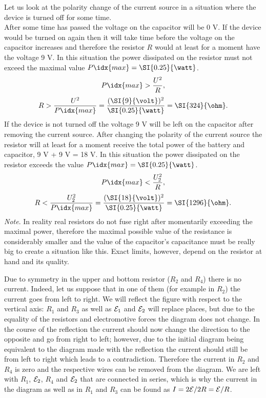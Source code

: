 \documentclass[11pt]{article}
\begin{document}
\solueng
Let us look at the polarity change of the current source in a situation where the device is turned off for some time.\\
After some time has passed the voltage on the capacitor will be 0 V. If the device would be turned on again then it will take time before the voltage on the capacitor increases and therefore the resistor $R$ would at least for a moment have the voltage 9 V. In this situation the power dissipated on the resistor must not exceed the maximal value $P\idx{max} = \SI{0.25}{\watt}$. 
\[P\idx{max} > \frac{U^2}{R},\] 
\[R > \frac{U^2}{P\idx{max}} = \frac{(\SI{9}{\volt})^2}{\SI{0.25}{\watt}} = \SI{324}{\ohm}. \]
If the device is not turned off the voltage 9 V will be left on the capacitor after removing the current source. After changing the polarity of the current source the resistor will at least for a moment receive the total power of the battery and capacitor, 9 V + 9 V = 18 V. In this situation the power dissipated on the resistor exceeds the value $P\idx{max} = \SI{0.25}{\watt}$. 
\[P\idx{max} < \frac{U_2^2}{R},\] 
\[R < \frac{U_2^2}{P\idx{max}} = \frac{(\SI{18}{\volt})^2}{\SI{0.25}{\watt}} = \SI{1296}{\ohm}. \]
\emph{Note}. In reality real resistors do not fuse right after momentarily exceeding the maximal power, therefore the maximal possible value of the resistance is considerably smaller and the value of the capacitor’s capacitance must be really big to create a situation like this. Exact limits, however, depend on the resistor at hand and its quality.
\probend
\bigskip


\solueng
Due to symmetry in the upper and bottom resistor ($R_2$ and $R_4$) there is no current. Indeed, let us suppose that in one of them (for example in $R_2$) the current goes from left to right. We will reflect the figure with respect to the vertical axis: $R_1$ and $R_3$ as well as ${\cal E}_1$ and ${\cal E}_2$ will replace places, but due to the equality of the resistors and electromotive forces the diagram does not change. In the course of the reflection the current should now change the direction to the opposite and go from right to left; however, due to the initial diagram being equivalent to the diagram made with the reflection the current should still be from left to right which leads to a contradiction. Therefore the current in $R_2$ and $R_4$ is zero and the respective wires can be removed from the diagram. We are left with $R_1$, ${\cal E}_2$, $R_4$ and ${\cal E}_2$ that are connected in series, which is why the current in the diagram as well as in $R_1$ and $R_3$ can be found as $I=2{\cal E}/2R = {\cal E}/R$.
\probend
\bigskip
\end{document}
